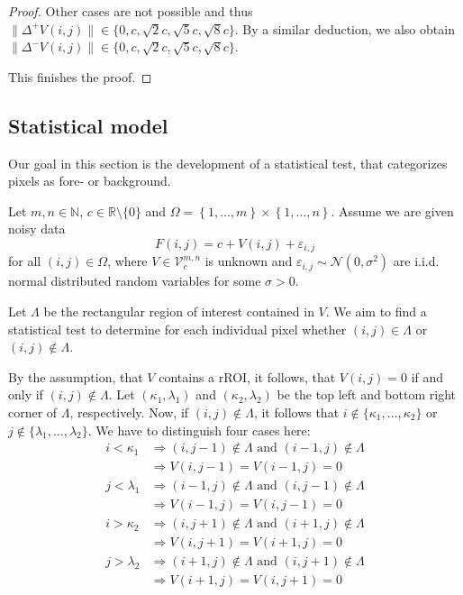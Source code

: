 \documentclass[a4paper,12pt]{article}
\newcommand{\norm}[1]{\lVert#1\rVert}
\theoremstyle{plain}
\theoremstyle{definition}
\begin{document}
\begin{proof}
	Other cases are not possible and thus $\norm{\Delta^+ V(i, j)} \in \{ 0, c, \sqrt{2} c, \sqrt{5} c, \sqrt{8} c \}$. By a similar deduction, we also obtain $\norm{\Delta^- V(i, j)} \in \{ 0, c, \sqrt{2} c, \sqrt{5} c, \sqrt{8} c \}$.
	
	This finishes the proof.
\end{proof}

\newpage

\subsection{Statistical model}\label{section: statisticalmodel}

Our goal in this section is the development of a statistical test, that categorizes pixels as fore- or background.

Let $m, n \in \mathbb{N}$, $c \in \mathbb{R} \setminus \{ 0 \}$ and $\Omega = \left\{ 1, \dots, m \right\} \times \left\{ 1, \dots, n \right\}$. Assume we are given noisy data
\begin{equation}\label{statmodel2}
	F(i, j) = c + V(i, j) + \varepsilon_{i, j}
\end{equation}
for all $(i, j) \in \Omega$, where $V \in \mathcal{V}_c^{m, n}$ is unknown and $\varepsilon_{i, j} \sim \mathcal{N}(0, \sigma^2)$ are i.i.d. normal distributed random variables for some $\sigma > 0$.

Let $\varLambda$ be the rectangular region of interest contained in $V$. We aim to find a statistical test to determine for each individual pixel whether $(i, j) \in \varLambda$ or $(i, j) \notin \varLambda$.

By the assumption, that $V$ contains a rROI, it follows, that $V(i, j) = 0$ if and only if $(i, j) \notin \varLambda$. Let $(\kappa_1, \lambda_1)$ and $(\kappa_2, \lambda_2)$ be the top left and bottom right corner of $\varLambda$, respectively. Now, if $(i, j) \notin \varLambda$, it follows that $i \notin \{ \kappa_1, \dots, \kappa_2 \}$ or $j \notin \{ \lambda_1, \dots, \lambda_2 \}$. We have to distinguish four cases here:
\begin{align*}
	i < \kappa_1 &\Rightarrow (i, j - 1) \notin \varLambda \textrm{ and } (i - 1, j) \notin \varLambda \\
	&\Rightarrow V(i, j - 1) = V(i - 1, j) = 0 \\
	j < \lambda_1 &\Rightarrow (i - 1, j) \notin \varLambda \textrm{ and } (i, j - 1) \notin \varLambda \\
	&\Rightarrow V(i - 1, j) = V(i, j - 1) = 0 \\
	i > \kappa_2 &\Rightarrow (i, j + 1) \notin \varLambda \textrm{ and } (i + 1, j) \notin \varLambda \\
	&\Rightarrow V(i, j + 1) = V(i + 1, j) = 0 \\
	j > \lambda_2 &\Rightarrow (i + 1, j) \notin \varLambda \textrm{ and } (i, j + 1) \notin \varLambda \\
	&\Rightarrow V(i + 1, j) = V(i, j + 1) = 0
\end{align*}
\end{document}

